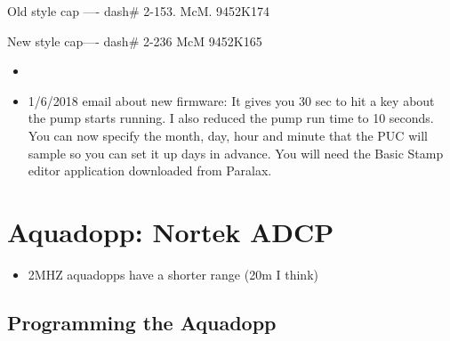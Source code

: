 \documentclass[
]{book}
\providecommand{\tightlist}{%
  \setlength{\itemsep}{0pt}\setlength{\parskip}{0pt}}
\begin{document}
Old style cap ---- dash\# 2-153. McM. 9452K174

New style cap---- dash\# 2-236 McM 9452K165

\begin{itemize}
\tightlist
\item
\item
  1/6/2018 email about new firmware: It gives you 30 sec to hit a key about the pump starts running. I also reduced the pump run time to 10 seconds. You can now specify the month, day, hour and minute that the PUC will sample so you can set it up days in advance. You will need the Basic Stamp editor application downloaded from Paralax.
\end{itemize}

\hypertarget{aquadopp-nortek-adcp}{%
\chapter{Aquadopp: Nortek ADCP}\label{aquadopp-nortek-adcp}}

\begin{itemize}
\tightlist
\item
  2MHZ aquadopps have a shorter range (20m I think)
\end{itemize}

\hypertarget{programming-the-aquadopp}{%
\section{Programming the Aquadopp}\label{programming-the-aquadopp}}
\end{document}

